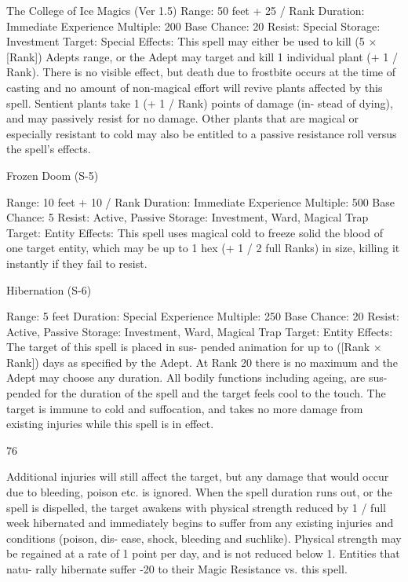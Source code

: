 \begin{Chapter}{The College of Ice Magics (Ver 1.5)}
Range: 50 feet + 25 / Rank 
Duration: Immediate 
Experience Multiple: 200 
Base Chance: 20%
Resist: Special 
Storage: Investment 
Target: Special 
Effects:  This  spell  may  either  be  used  to  kill  (5  × 
[Rank])%
Adepts  range,  or  the  Adept  may  target  and  kill  1 
individual  plant  (+  1  /  Rank).  There  is  no  visible 
effect, but death due to frostbite occurs at the time 
of  casting  and  no  amount  of  non-magical  effort 
will  revive  plants  affected  by  this  spell.  Sentient 
plants  take  1  (+  1  /  Rank)  points  of  damage  (in-
stead  of  dying),  and  may  passively  resist  for  no 
damage. Other plants that are magical or especially 
resistant  to  cold  may  also  be  entitled  to  a  passive 
resistance roll versus the spell’s effects. 

Frozen Doom (S-5) 

Range: 10 feet + 10 / Rank 
Duration: Immediate 
Experience Multiple: 500 
Base Chance: 5%
Resist: Active, Passive 
Storage: Investment, Ward, Magical Trap 
Target: Entity 
Effects: This spell uses magical cold to freeze solid 
the blood of one target entity, which may be up to 
1 hex (+ 1 / 2 full Ranks) in size, killing it instantly 
if they fail to resist. 

Hibernation (S-6) 

Range: 5 feet 
Duration: Special 
Experience Multiple: 250 
Base Chance: 20%
Resist: Active, Passive 
Storage: Investment, Ward, Magical Trap 
Target: Entity 
Effects:  The  target  of  this  spell  is  placed  in  sus-
pended  animation  for  up  to  ([Rank  ×  Rank])  days 
as  specified  by  the  Adept.  At  Rank  20  there  is  no 
maximum and the Adept may choose any duration. 
All  bodily  functions  including  ageing,  are  sus-
pended  for  the  duration  of  the  spell  and  the  target 
feels  cool  to  the  touch.  The  target  is  immune  to 
cold  and  suffocation,  and  takes  no  more  damage 
from  existing  injuries  while  this  spell  is  in  effect. 

76 

Additional  injuries  will  still  affect  the  target,  but 
any  damage  that  would  occur  due  to  bleeding, 
poison etc. is ignored. When the spell duration runs 
out,  or  the  spell  is  dispelled,  the  target  awakens 
with  physical  strength  reduced  by  1  /  full  week 
hibernated  and  immediately  begins  to  suffer  from 
any  existing  injuries  and  conditions  (poison,  dis-
ease,  shock,  bleeding  and  suchlike).  Physical 
strength  may  be  regained  at  a  rate  of  1  point  per 
day, and is not reduced below 1. Entities that natu-
rally hibernate suffer -20 to their Magic Resistance 
vs. this spell. 


\end{Chapter}
